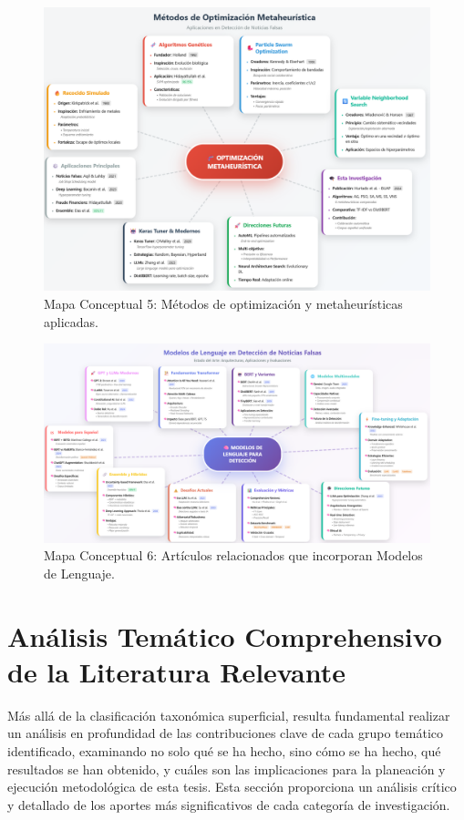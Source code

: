 \begin{figure}[h!]
    \centering
    \includegraphics[width=\textwidth]{Imagenes/mapaConceptual5.png}
    \caption{Mapa Conceptual 5: Métodos de optimización y metaheurísticas aplicadas.}
    \label{fig:mapa_conceptual_5}
\end{figure}

\begin{figure}[h!]
    \centering
    \includegraphics[width=\textwidth]{Imagenes/mapaConceptual6.png}
    \caption{Mapa Conceptual 6: Artículos relacionados que incorporan Modelos de Lenguaje.}
    \label{fig:mapa_conceptual_6}
\end{figure}

\section{Análisis Temático Comprehensivo de la Literatura Relevante}
\label{sec:analisis_tematico}

Más allá de la clasificación taxonómica superficial, resulta fundamental realizar un análisis en profundidad de las contribuciones clave de cada grupo temático identificado, examinando no solo qué se ha hecho, sino cómo se ha hecho, qué resultados se han obtenido, y cuáles son las implicaciones para la planeación y ejecución metodológica de esta tesis. Esta sección proporciona un análisis crítico y detallado de los aportes más significativos de cada categoría de investigación.

